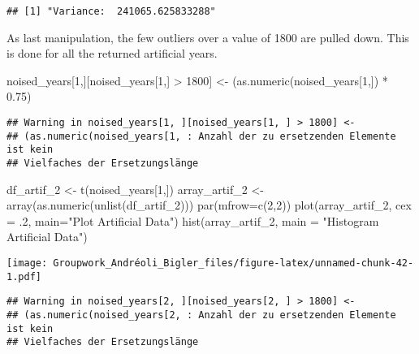 \documentclass[
]{article}
\newenvironment{Shaded}{\begin{snugshade}}{\end{snugshade}}
\newcommand{\AttributeTok}[1]{\textcolor[rgb]{0.77,0.63,0.00}{#1}}
\newcommand{\DecValTok}[1]{\textcolor[rgb]{0.00,0.00,0.81}{#1}}
\newcommand{\FloatTok}[1]{\textcolor[rgb]{0.00,0.00,0.81}{#1}}
\newcommand{\FunctionTok}[1]{\textcolor[rgb]{0.00,0.00,0.00}{#1}}
\newcommand{\NormalTok}[1]{#1}
\newcommand{\OtherTok}[1]{\textcolor[rgb]{0.56,0.35,0.01}{#1}}
\newcommand{\SpecialCharTok}[1]{\textcolor[rgb]{0.00,0.00,0.00}{#1}}
\newcommand{\StringTok}[1]{\textcolor[rgb]{0.31,0.60,0.02}{#1}}
\begin{document}
\begin{verbatim}
## [1] "Variance:  241065.625833288"
\end{verbatim}

As last manipulation, the few outliers over a value of 1800 are pulled
down. This is done for all the returned artificial years.

\begin{Shaded}
\begin{Highlighting}[]
\NormalTok{noised\_years[}\DecValTok{1}\NormalTok{,][noised\_years[}\DecValTok{1}\NormalTok{,] }\SpecialCharTok{\textgreater{}} \DecValTok{1800}\NormalTok{] }\OtherTok{\textless{}{-}}\NormalTok{ (}\FunctionTok{as.numeric}\NormalTok{(noised\_years[}\DecValTok{1}\NormalTok{,]) }\SpecialCharTok{*} \FloatTok{0.75}\NormalTok{)}
\end{Highlighting}
\end{Shaded}

\begin{verbatim}
## Warning in noised_years[1, ][noised_years[1, ] > 1800] <-
## (as.numeric(noised_years[1, : Anzahl der zu ersetzenden Elemente ist kein
## Vielfaches der Ersetzungslänge
\end{verbatim}

\begin{Shaded}
\begin{Highlighting}[]
\NormalTok{df\_artif\_2 }\OtherTok{\textless{}{-}} \FunctionTok{t}\NormalTok{(noised\_years[}\DecValTok{1}\NormalTok{,])}
\NormalTok{array\_artif\_2 }\OtherTok{\textless{}{-}} \FunctionTok{array}\NormalTok{(}\FunctionTok{as.numeric}\NormalTok{(}\FunctionTok{unlist}\NormalTok{(df\_artif\_2)))}
\FunctionTok{par}\NormalTok{(}\AttributeTok{mfrow=}\FunctionTok{c}\NormalTok{(}\DecValTok{2}\NormalTok{,}\DecValTok{2}\NormalTok{))}
\FunctionTok{plot}\NormalTok{(array\_artif\_2, }\AttributeTok{cex =}\NormalTok{ .}\DecValTok{2}\NormalTok{, }\AttributeTok{main=}\StringTok{"Plot Artificial Data"}\NormalTok{)}
\FunctionTok{hist}\NormalTok{(array\_artif\_2, }\AttributeTok{main =} \StringTok{"Histogram Artificial Data"}\NormalTok{)}
\end{Highlighting}
\end{Shaded}

\texttt{[image: Groupwork\_Andréoli\_Bigler\_files/figure-latex/unnamed-chunk-42-1.pdf]}

\begin{verbatim}
## Warning in noised_years[2, ][noised_years[2, ] > 1800] <-
## (as.numeric(noised_years[2, : Anzahl der zu ersetzenden Elemente ist kein
## Vielfaches der Ersetzungslänge
\end{verbatim}
\end{document}

